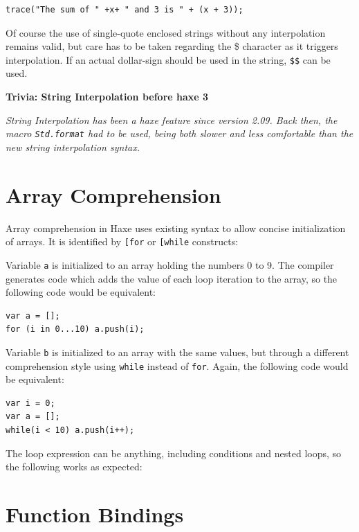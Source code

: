 \documentclass[a4paper,oneside]{book}
\newcommand{\expr}[1]{\texttt{#1}}
\newenvironment{myshaded}
  {\def\FrameCommand{\fboxsep=\topsep\colorbox{bgcolor}}%
  \MakeFramed {\advance\hsize-\width \FrameRestore}}%
 {\endMakeFramed}
\newcommand{\trivia}[2]
	{\begin{myshaded}\noindent\textbf{Trivia: #1}\par\nobreak\noindent\ignorespaces\textit{#2}\end{myshaded}}
\newcommand{\haxe}[2][]{%
}
\begin{document}
\begin{lstlisting}
trace("The sum of " +x+ " and 3 is " + (x + 3));
\end{lstlisting}
Of course the use of single-quote enclosed strings without any interpolation remains valid, but care has to be taken regarding the \$ character as it triggers interpolation. If an actual dollar-sign should be used in the string, \expr{\$\$} can be used.

\trivia{String Interpolation before haxe 3}{String Interpolation has been a haxe feature since version 2.09. Back then, the macro \expr{Std.format} had to be used, being both slower and less comfortable than the new string interpolation syntax.}


\section{Array Comprehension}
\label{lf-array-comprehension}

Array comprehension in Haxe uses existing syntax to allow concise initialization of arrays. It is identified by \expr{[for} or \expr{[while} constructs:

\haxe{assets/ArrayComprehension.hx}

Variable \expr{a} is initialized to an array holding the numbers 0 to 9. The compiler generates code which adds the value of each loop iteration to the array, so the following code would be equivalent:

\begin{lstlisting}
var a = [];
for (i in 0...10) a.push(i);
\end{lstlisting}

Variable \expr{b} is initialized to an array with the same values, but through a different comprehension style using \expr{while} instead of \expr{for}. Again, the following code would be equivalent:

\begin{lstlisting}
var i = 0;
var a = [];
while(i < 10) a.push(i++);
\end{lstlisting}

The loop expression can be anything, including conditions and nested loops, so the following works as expected:

\haxe{assets/AdvArrayComprehension.hx}


\section{Function Bindings}
\label{lf-function-bindings}
\end{document}
